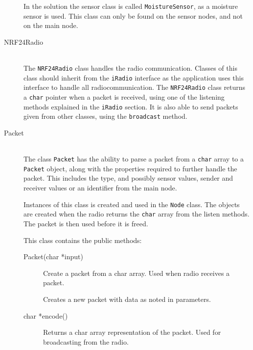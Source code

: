 \begin{description}
In the solution the sensor class is called \texttt{MoistureSensor}, as a moisture sensor is used. This class can only be found on the sensor nodes, and not on the main node.


\item[NRF24Radio] \hfill \\
The \texttt{NRF24Radio} class handles the radio communication. Classes of this class should inherit from the \texttt{iRadio} interface as the application uses this interface to handle all radiocommunication. The \texttt{NRF24Radio} class returns a \texttt{char} pointer when a packet is received, using one of the listening methods explained in the \texttt{iRadio} section. It is also able to send packets given from other classes, using the \texttt{broadcast} method.

\item[Packet] \hfill \\
The class \texttt{Packet} has the ability to parse a packet from a \texttt{char} array to a \texttt{Packet} object, along with the properties required to further handle the packet. This includes the type, and possibly sensor values, sender and receiver values or an identifier from the main node.

Instances of this class is created and used in the \texttt{Node} class. The objects are created when the radio returns the \texttt{char} array from the listen methods. The packet is then used before it is freed.

This class contains the public methods:
\begin{description}
\item[Packet(char *input)] Create a packet from a char array. Used when radio receives a packet.
\item[{\parbox[t]{0.6\linewidth}{Packet(PacketType packetTypeInput, \\ uint16\_t addresserInput, \\ uint16\_t addresseeInput, \\ uint16\_t originInput, \\ uint16\_t value1Input, \\ uint16\_t value2Input, \\ uint16\_t value3Input)}}] \item[] Creates a new packet with data as noted in parameters.
\item[char *encode()] Returns a char array representation of the packet. Used for broadcasting from the radio.
\end{description}

\end{description}


